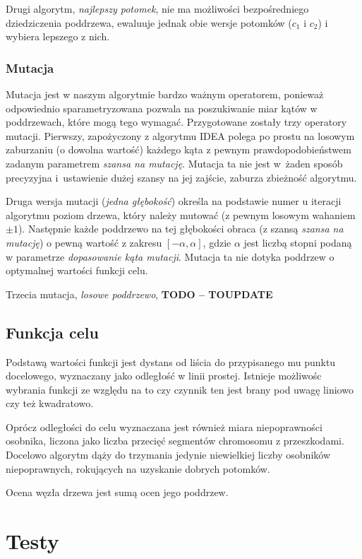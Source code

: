 \documentclass[11pt, leqno]{article}
\renewcommand{\i}[1]{\textit{#1}}
\begin{document}
Drugi algorytm, \i{najlepszy potomek}, nie ma możliwości bezpośredniego dziedziczenia poddrzewa, ewaluuje jednak obie wersje potomków ($c_1$ i $c_2$) i wybiera lepszego z nich.

\subsubsection{Mutacja}
Mutacja jest w naszym algorytmie bardzo ważnym operatorem, ponieważ odpowiednio sparametryzowana pozwala na poszukiwanie miar kątów w poddrzewach, które mogą tego wymagać. Przygotowane zostały trzy operatory mutacji. Pierwszy, zapożyczony z algorytmu IDEA polega po prostu na losowym zaburzaniu (o dowolna wartość) każdego kąta z pewnym prawdopodobieństwem zadanym parametrem \i{szansa na mutację}. Mutacja ta nie jest w~żaden sposób precyzyjna i~ustawienie dużej szansy na jej zajście, zaburza zbieżność algorytmu.

Druga wersja mutacji (\i{jedna głębokość}) określa na podstawie numer u iteracji algorytmu poziom drzewa, który należy mutować (z pewnym losowym wahaniem $\pm 1$). Następnie każde poddrzewo na tej głębokości obraca (z szansą \i{szansa na mutację}) o pewną wartość z zakresu $[-\alpha, \alpha]$, gdzie $\alpha$ jest liczbą stopni podaną w parametrze \i{dopasowanie kąta mutacji}. Mutacja ta nie dotyka poddrzew o optymalnej wartości funkcji celu.

Trzecia mutacja, \i{losowe poddrzewo}, \textbf{TODO -- TOUPDATE}

\subsection{Funkcja celu}
Podstawą wartości funkcji jest dystans od liścia do przypisanego mu punktu docelowego, wyznaczany jako odległość w linii prostej. Istnieje możliwośc wybrania funkcji ze względu na to czy czynnik ten jest brany pod uwagę liniowo czy też kwadratowo.

Oprócz odległości do celu wyznaczana jest również miara niepoprawności osobnika, liczona jako liczba przecięć segmentów chromosomu z przeszkodami. Docelowo algorytm dąży do trzymania jedynie niewielkiej liczby osobników niepoprawnych, rokujących na uzyskanie dobrych potomków.

Ocena węzła drzewa jest sumą ocen jego poddrzew. 


\section{Testy}
\end{document}
